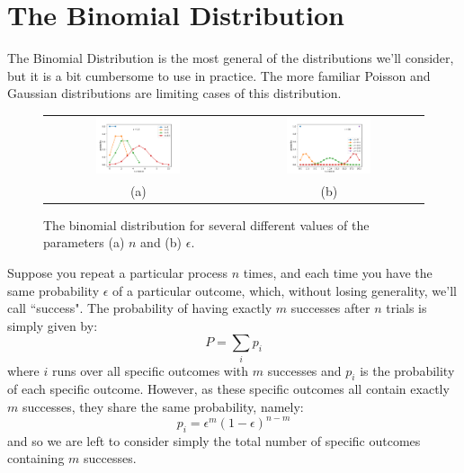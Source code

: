 \documentclass[12pt,oneside]{book}
\begin{document}
\section{The  Binomial Distribution}

The Binomial Distribution is the most general of the distributions
we'll consider, but it is a bit cumbersome to use in practice.  The
more familiar Poisson and Gaussian distributions are limiting cases of
this distribution.

\begin{figure}[htbp]
\begin{center}
\begin{tabular}{cc}
{\includegraphics[width=0.47\textwidth]{figs/binom_n.pdf}} &
{\includegraphics[width=0.47\textwidth]{figs/binom_eps.pdf}} \\
(a) & (b) \\
\end{tabular}
\end{center}
\caption{\label{fig:binom} The binomial distribution for several different values of the parameters (a) $n$ and (b) $\epsilon$.}
\end{figure}

Suppose you repeat a particular process $n$ times, and each time you
have the same probability $\epsilon$ of a particular outcome, which,
without losing generality, we'll call ``success".  The probability of
having exactly $m$ successes after $n$ trials is simply given by:
\begin{displaymath}
P = \sum_i p_i
\end{displaymath}
where $i$ runs over all specific outcomes with $m$ successes and $p_i$
is the probability of each specific outcome.  However, as these
specific outcomes all contain exactly $m$ successes, they share the
same probability, namely:
\begin{displaymath}
p_i = \epsilon^m (1 - \epsilon)^{n-m}
\end{displaymath}
and so we are left to consider simply the total number of specific outcomes containing $m$ successes.  
\end{document}
